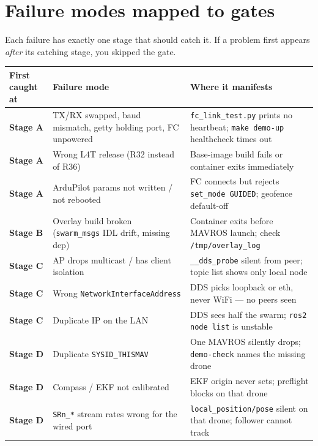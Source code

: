 \documentclass[11pt,a4paper]{article}
\begin{document}
\newpage

\section{Failure modes mapped to gates}

Each failure has exactly one stage that should catch it. If a problem first
appears \emph{after} its catching stage, you skipped the gate.

\begin{center}
\renewcommand{\arraystretch}{1.3}
\begin{tabularx}{16cm}{p{2.5cm}p{5cm}X}
\toprule
\textbf{First caught at} & \textbf{Failure mode} & \textbf{Where it manifests} \\
\midrule
\textbf{Stage A} & TX/RX swapped, baud mismatch, getty holding port, FC unpowered & \texttt{fc\_link\_test.py} prints no heartbeat; \texttt{make demo-up} healthcheck times out \\
\textbf{Stage A} & Wrong L4T release (R32 instead of R36) & Base-image build fails or container exits immediately \\
\textbf{Stage A} & ArduPilot params not written / not rebooted & FC connects but rejects \texttt{set\_mode GUIDED}; geofence default-off \\
\textbf{Stage B} & Overlay build broken (\texttt{swarm\_msgs} IDL drift, missing dep) & Container exits before MAVROS launch; check \texttt{/tmp/overlay\_log} \\
\textbf{Stage C} & AP drops multicast / has client isolation & \texttt{\_\_dds\_probe} silent from peer; topic list shows only local node \\
\textbf{Stage C} & Wrong \texttt{NetworkInterfaceAddress} & DDS picks loopback or eth, never WiFi --- no peers seen \\
\textbf{Stage C} & Duplicate IP on the LAN & DDS sees half the swarm; \texttt{ros2 node list} is unstable \\
\textbf{Stage D} & Duplicate \texttt{SYSID\_THISMAV} & One MAVROS silently drops; \texttt{demo-check} names the missing drone \\
\textbf{Stage D} & Compass / EKF not calibrated & EKF origin never sets; preflight blocks on that drone \\
\textbf{Stage D} & \texttt{SRn\_*} stream rates wrong for the wired port & \texttt{local\_position/pose} silent on that drone; follower cannot track \\

\end{tabularx}
\end{center}
\end{document}
